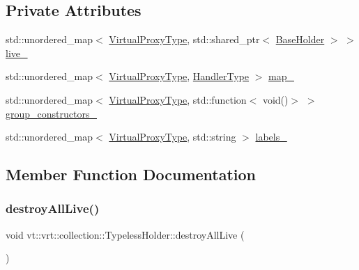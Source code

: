 \subsection*{Private Attributes}
\begin{DoxyCompactItemize}
\item 
std\+::unordered\+\_\+map$<$ \hyperlink{namespacevt_a1b417dd5d684f045bb58a0ede70045ac}{Virtual\+Proxy\+Type}, std\+::shared\+\_\+ptr$<$ \hyperlink{structvt_1_1vrt_1_1collection_1_1_base_holder}{Base\+Holder} $>$ $>$ \hyperlink{structvt_1_1vrt_1_1collection_1_1_typeless_holder_a4bd5437b31c3717f2d18bd50f1398c68}{live\+\_\+}
\item 
std\+::unordered\+\_\+map$<$ \hyperlink{namespacevt_a1b417dd5d684f045bb58a0ede70045ac}{Virtual\+Proxy\+Type}, \hyperlink{namespacevt_af64846b57dfcaf104da3ef6967917573}{Handler\+Type} $>$ \hyperlink{structvt_1_1vrt_1_1collection_1_1_typeless_holder_a0981e429155d61f17b0d0149eea20942}{map\+\_\+}
\item 
std\+::unordered\+\_\+map$<$ \hyperlink{namespacevt_a1b417dd5d684f045bb58a0ede70045ac}{Virtual\+Proxy\+Type}, std\+::function$<$ void()$>$ $>$ \hyperlink{structvt_1_1vrt_1_1collection_1_1_typeless_holder_ab8f7746123d0c0ec93fb1dce7aeb5cff}{group\+\_\+constructors\+\_\+}
\item 
std\+::unordered\+\_\+map$<$ \hyperlink{namespacevt_a1b417dd5d684f045bb58a0ede70045ac}{Virtual\+Proxy\+Type}, std\+::string $>$ \hyperlink{structvt_1_1vrt_1_1collection_1_1_typeless_holder_a27f9fe0f0d5d9629195393f2d302a7e6}{labels\+\_\+}
\end{DoxyCompactItemize}


\subsection{Member Function Documentation}
\mbox{\label{structvt_1_1vrt_1_1collection_1_1_typeless_holder_af968b98622d1d81888d8667a94e5950d}} 
\subsubsection{\texorpdfstring{destroy\+All\+Live()}{destroyAllLive()}}
{\footnotesize\ttfamily void vt\+::vrt\+::collection\+::\+Typeless\+Holder\+::destroy\+All\+Live (\begin{DoxyParamCaption}{ }\end{DoxyParamCaption})}

